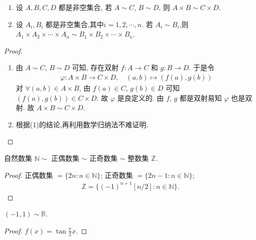 \documentclass[../../main.tex]{subfiles}
\begin{document}
\begin{proposition}\label{proposition:对等集合的积也对等}
\begin{enumerate}[(1)]
\item 设 $A, B, C, D$ 都是非空集合, 若 $A \sim C$, $B \sim D$, 则 $A \times B \sim C \times D$.

\item 设 $A_i, B_i$ 都是非空集合,其中$i=1,2,\cdots,n$. 若 $A_i \sim B_i$,则 $A_1\times A_2\times \cdots \times A_n\sim B_1\times B_2\times \cdots \times B_n$.
\end{enumerate}
\end{proposition}
\begin{proof}
\begin{enumerate}[(1)]
\item 由 $A \sim C$, $B \sim D$ 可知, 存在双射 $f : A \rightarrow C$ 和 $g : B \rightarrow D$. 于是令
\begin{align*}
\varphi : A \times B \rightarrow C \times D, \quad (a, b) \mapsto (f(a), g(b))
\end{align*}
对 $\forall (a, b) \in A \times B$, 由 $f(a) \in C$, $g(b) \in D$ 可知 $(f(a), g(b)) \in C \times D$. 故 $\varphi$ 是良定义的. 由 $f$, $g$ 都是双射易知 $\varphi$ 也是双射. 故 $A \times B \sim C \times D$. 


\item 根据(1)的结论,再利用数学归纳法不难证明.
\end{enumerate}

\end{proof}

\begin{example}
自然数集 $\mathbb{N} \sim$ 正偶数集 $\sim$ 正奇数集 $\sim$ 整数集 $\mathbb{Z}$.
\end{example}
\begin{proof}
正偶数集 $= \{2n : n \in \mathbb{N}\}$; 正奇数集 $= \{2n - 1 : n \in \mathbb{N}\}$;
\begin{align*}
\mathbb{Z} = \{(-1)^{n + 1}[n/2] : n \in \mathbb{N}\}.
\end{align*}

\end{proof}

\begin{example}\label{example-214234210.2}
$(-1, 1) \sim \mathbb{R}$.
\end{example}
\begin{proof}
$f(x) = \tan \frac{\pi}{2}x$.

\end{proof}
\end{document}
